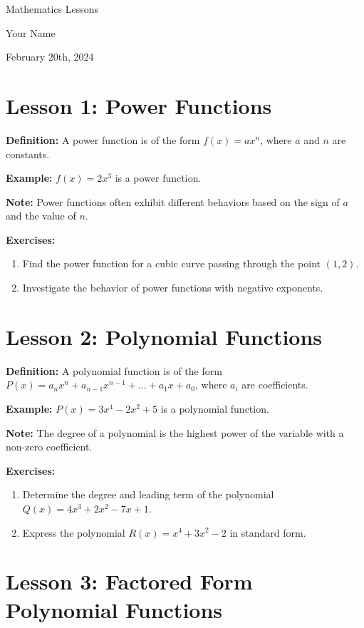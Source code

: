 \documentclass{article}
\newcommand{\colorsection}[1]{\section*{\textcolor{lessoncolor}{#1}}}
\begin{document}
\begin{titlepage}
    \centering
    \vspace*{2cm}
    {\LARGE \textcolor{lessoncolor}{Mathematics Lessons}}\par
    \vspace{1cm}
    {\large Your Name}\par
    \vspace{2cm}
    {\large February 20th, 2024}\par
    \vspace{3cm}
\end{titlepage}

\colorsection{Lesson 1: Power Functions}

\textbf{Definition:} A power function is of the form \( f(x) = ax^n \), where \( a \) and \( n \) are constants.

\textbf{Example:} \( f(x) = 2x^3 \) is a power function.

\textbf{Note:} Power functions often exhibit different behaviors based on the sign of \( a \) and the value of \( n \).

\textbf{Exercises:}
\begin{enumerate}
    \item Find the power function for a cubic curve passing through the point \((1, 2)\).
    \item Investigate the behavior of power functions with negative exponents.
\end{enumerate}

\colorsection{Lesson 2: Polynomial Functions}

\textbf{Definition:} A polynomial function is of the form \( P(x) = a_nx^n + a_{n-1}x^{n-1} + \ldots + a_1x + a_0 \), where \( a_i \) are coefficients.

\textbf{Example:} \( P(x) = 3x^4 - 2x^2 + 5 \) is a polynomial function.

\textbf{Note:} The degree of a polynomial is the highest power of the variable with a non-zero coefficient.

\textbf{Exercises:}
\begin{enumerate}
    \item Determine the degree and leading term of the polynomial \( Q(x) = 4x^3 + 2x^2 - 7x + 1 \).
    \item Express the polynomial \( R(x) = x^4 + 3x^2 - 2 \) in standard form.
\end{enumerate}

\colorsection{Lesson 3: Factored Form Polynomial Functions}
\end{document}
